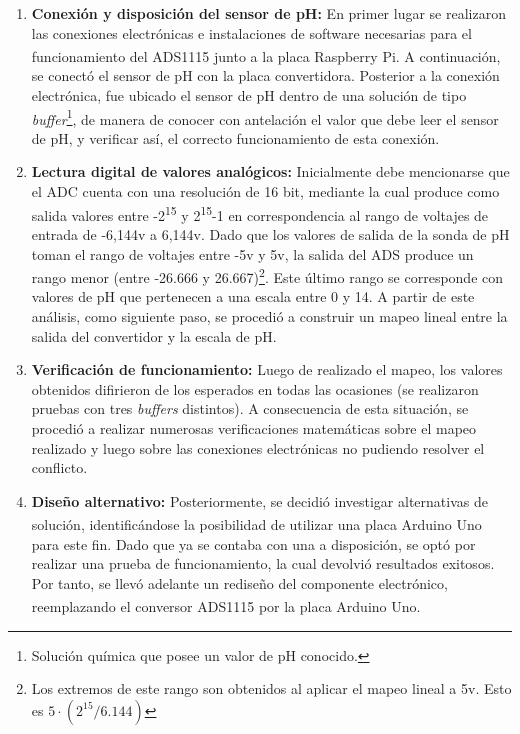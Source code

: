                 \begin{enumerate}

                \item \textbf{Conexión y disposición del sensor de pH:} En primer lugar se realizaron las conexiones electrónicas e instalaciones de software necesarias para el funcionamiento del ADS1115 junto a la placa Raspberry\textsuperscript{\textregistered} Pi. A continuación, se conectó el sensor de pH con la placa convertidora. Posterior a la conexión electrónica, fue ubicado el sensor de pH dentro de una solución de tipo \textit{buffer}\footnote{Solución química que posee un valor de pH conocido.}, de manera de conocer con antelación el valor que debe leer el sensor de pH, y verificar así, el correcto funcionamiento de esta conexión.
                
                \item \textbf{Lectura digital de valores analógicos:} Inicialmente debe mencionarse que el ADC cuenta con una resolución de 16 bit, mediante la cual produce como salida valores entre -2\textsuperscript{15} y 2\textsuperscript{15}-1 en correspondencia al rango de voltajes de entrada de -6,144v a 6,144v. Dado que los valores de salida de la sonda de pH toman el rango de voltajes entre -5v y 5v, la salida del ADS produce un rango menor (entre -26.666 y 26.667)\footnote{ Los extremos de este rango son obtenidos al aplicar el mapeo lineal a 5v. Esto es $ 5 \cdot (2^{15} / 6.144)$  }. Este último rango se corresponde con valores de pH que pertenecen a una escala entre 0 y 14. A partir de este análisis, como siguiente paso, se procedió a construir un mapeo lineal entre la salida del convertidor y la escala de pH.
                
                \item \textbf{Verificación de funcionamiento:} Luego de realizado el mapeo, los valores obtenidos difirieron de los esperados en todas las ocasiones (se realizaron pruebas con tres \textit{buffers} distintos). A consecuencia de esta situación, se procedió a realizar numerosas verificaciones matemáticas sobre el mapeo realizado y luego sobre las conexiones electrónicas no pudiendo resolver el conflicto.
                
                \item \textbf{Diseño alternativo:} Posteriormente, se decidió investigar alternativas de solución, identificándose la posibilidad de utilizar una placa Arduino \textsuperscript{\textregistered} Uno para este fin. Dado que ya se contaba con una a disposición, se optó por realizar una prueba de funcionamiento, la cual devolvió resultados exitosos. Por tanto, se llevó adelante un rediseño del componente electrónico, reemplazando el conversor ADS1115 por la placa  Arduino\textsuperscript{\textregistered} Uno.
                \end{enumerate}
                
